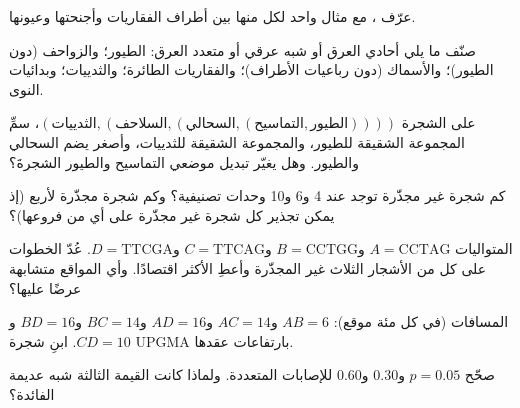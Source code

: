 \begin{exercise}[$\star$]\label{exo:b2:phylogenetic-trees:1}
عرّف   ، مع مثال واحد
لكل منها بين أطراف الفقاريات وأجنحتها وعيونها.
\end{exercise}

\begin{exercise}[$\star$]\label{exo:b2:phylogenetic-trees:2}
صنّف ما يلي أحادي العرق أو شبه عرقي أو متعدد العرق: الطيور؛
والزواحف (دون الطيور)؛ والأسماك (دون رباعيات الأطراف)؛ والفقاريات
الطائرة؛ والثدييات؛ وبدائيات النوى.
\end{exercise}

\begin{exercise}[$\star$]\label{exo:b2:phylogenetic-trees:3}
على الشجرة $(\text{الثدييات},(\text{السلاحف},(\text{السحالي},
(\text{التماسيح},\text{الطيور}))))$، سمِّ المجموعة الشقيقة
للطيور، والمجموعة الشقيقة للثدييات، وأصغر 
يضم السحالي والطيور. وهل يغيّر تبديل موضعي
التماسيح والطيور الشجرةَ؟
\end{exercise}

\begin{exercise}[$\star$]\label{exo:b2:phylogenetic-trees:4}
كم شجرة غير مجذّرة توجد عند 4 و6 و10 وحدات تصنيفية؟ وكم شجرة
مجذّرة لأربع (إذ يمكن تجذير كل شجرة غير مجذّرة على أي من
فروعها)؟
\end{exercise}

\begin{exercise}[$\star\star$]\label{exo:b2:phylogenetic-trees:5}
المتواليات $A = \mathrm{CCTAG}$ و$B = \mathrm{CCTGG}$ و$C =
\mathrm{TTCAG}$ و$D = \mathrm{TTCGA}$. عُدّ الخطوات على كل من
الأشجار الثلاث غير المجذّرة وأعطِ الأكثر اقتصادًا. وأي
المواقع متشابهة عرضًا عليها؟
\end{exercise}

\begin{exercise}[$\star\star$]\label{exo:b2:phylogenetic-trees:6}
المسافات (في كل مئة موقع): $AB = 6$ و$AC = 14$ و$AD = 16$
و$BC = 14$ و$BD = 16$ و$CD = 10$. ابنِ شجرة UPGMA بارتفاعات
عقدها.
\end{exercise}

\begin{exercise}[$\star\star$]\label{exo:b2:phylogenetic-trees:7}
صحّح $p = 0.05$ و$0.30$ و$0.60$ للإصابات المتعددة. ولماذا كانت
القيمة الثالثة شبه عديمة الفائدة؟
\end{exercise}


